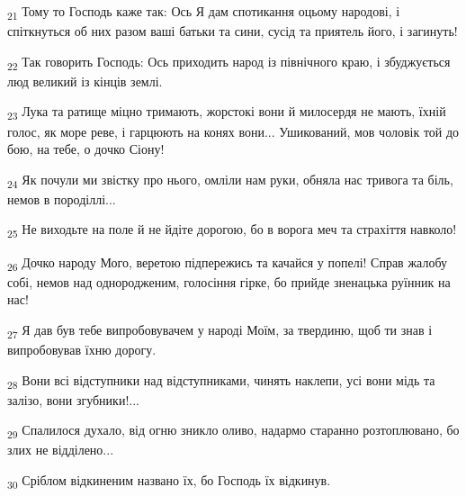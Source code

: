 \begin{tcolorbox}
\textsubscript{21} Тому то Господь каже так: Ось Я дам спотикання оцьому народові, і спіткнуться об них разом ваші батьки та сини, сусід та приятель його, і загинуть!
\end{tcolorbox}
\begin{tcolorbox}
\textsubscript{22} Так говорить Господь: Ось приходить народ із північного краю, і збуджується люд великий із кінців землі.
\end{tcolorbox}
\begin{tcolorbox}
\textsubscript{23} Лука та ратище міцно тримають, жорстокі вони й милосердя не мають, їхній голос, як море реве, і гарцюють на конях вони... Ушикований, мов чоловік той до бою, на тебе, о дочко Сіону!
\end{tcolorbox}
\begin{tcolorbox}
\textsubscript{24} Як почули ми звістку про нього, омліли нам руки, обняла нас тривога та біль, немов в породіллі...
\end{tcolorbox}
\begin{tcolorbox}
\textsubscript{25} Не виходьте на поле й не йдіте дорогою, бо в ворога меч та страхіття навколо!
\end{tcolorbox}
\begin{tcolorbox}
\textsubscript{26} Дочко народу Мого, веретою підпережись та качайся у попелі! Справ жалобу собі, немов над однородженим, голосіння гірке, бо прийде зненацька руїнник на нас!
\end{tcolorbox}
\begin{tcolorbox}
\textsubscript{27} Я дав був тебе випробовувачем у народі Моїм, за твердиню, щоб ти знав і випробовував їхню дорогу.
\end{tcolorbox}
\begin{tcolorbox}
\textsubscript{28} Вони всі відступники над відступниками, чинять наклепи, усі вони мідь та залізо, вони згубники!...
\end{tcolorbox}
\begin{tcolorbox}
\textsubscript{29} Спалилося духало, від огню зникло оливо, надармо старанно розтоплювано, бо злих не відділено...
\end{tcolorbox}
\begin{tcolorbox}
\textsubscript{30} Сріблом відкиненим названо їх, бо Господь їх відкинув.
\end{tcolorbox}
